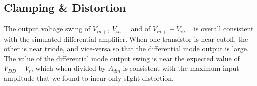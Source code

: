 \subsection{Clamping \& Distortion}
The output voltage swing of $V_{in+}$, $V_{in-}$, and of $V_{in+} - V_{in-}$ is overall consistent with the simulated differential amplifier.
When one transistor is near cutoff, the other is near triode, and vice-versa so that the differential mode output is large.
The value of the differential mode output swing is near the expected value of $V_{DD} - V_{t}$, which when divided by $A_{dm}$ is consistent with the maximum input amplitude that we found to incur only slight distortion.
